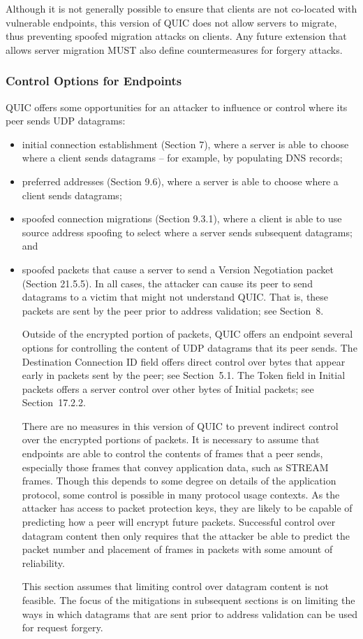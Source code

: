 \documentclass{article}
\begin{document}
Although it is not generally possible to ensure that clients are not co-located with vulnerable endpoints, this version of QUIC does not allow servers to migrate, thus preventing spoofed migration attacks on clients.  Any future extension that allows server migration MUST also define countermeasures for forgery attacks.

\subsubsection{Control Options for Endpoints}

QUIC offers some opportunities for an attacker to influence or control where its peer sends UDP datagrams:

\begin{itemize}
\item initial connection establishment (Section 7), where a server is able to choose where a client sends datagrams -- for example, by populating DNS records;
\item preferred addresses (Section 9.6), where a server is able to choose where a client sends datagrams;
\item spoofed connection migrations (Section 9.3.1), where a client is able to use source address spoofing to select where a server sends subsequent datagrams; and
\item spoofed packets that cause a server to send a Version Negotiation packet (Section 21.5.5).
In all cases, the attacker can cause its peer to send datagrams to a victim that might not understand QUIC.  That is, these packets are sent by the peer prior to address validation; see Section~8.

Outside of the encrypted portion of packets, QUIC offers an endpoint several options for controlling the content of UDP datagrams that its peer sends.  The Destination Connection ID field offers direct control over bytes that appear early in packets sent by the peer; see Section~5.1.  The Token field in Initial packets offers a server control over other bytes of Initial packets; see Section~17.2.2.

There are no measures in this version of QUIC to prevent indirect control over the encrypted portions of packets.  It is necessary to assume that endpoints are able to control the contents of frames that a peer sends, especially those frames that convey application data, such as STREAM frames.  Though this depends to some degree on details of the application protocol, some control is possible in many protocol usage contexts.  As the attacker has access to packet protection keys, they are likely to be capable of predicting how a peer will encrypt future packets.  Successful control over datagram content then only requires that the attacker be able to predict the packet number and placement of frames in packets with some amount of reliability.

This section assumes that limiting control over datagram content is not feasible.  The focus of the mitigations in subsequent sections is on limiting the ways in which datagrams that are sent prior to address validation can be used for request forgery.

\end{itemize}
\end{document}

